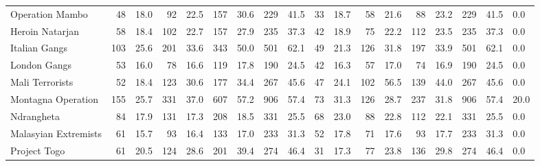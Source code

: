 \begin{tabular}{lrrrrrrrrrrrrrrrrl}
Operation Mambo      &                48 &  18.0 &   92 &  22.5 &  157 &  30.6 &  229 &  41.5 &               33 &   18.7 &   58 &   21.6 &   88 &   23.2 &  229 &  41.5 &        0.0 \\
Heroin Natarjan      &                58 &  18.4 &  102 &  22.7 &  157 &  27.9 &  235 &  37.3 &               42 &   18.9 &   75 &   22.2 &  112 &   23.5 &  235 &  37.3 &        0.0 \\
Italian Gangs        &               103 &  25.6 &  201 &  33.6 &  343 &  50.0 &  501 &  62.1 &               49 &   21.3 &  126 &   31.8 &  197 &   33.9 &  501 &  62.1 &        0.0 \\
London Gangs         &                53 &  16.0 &   78 &  16.6 &  119 &  17.8 &  190 &  24.5 &               42 &   16.3 &   57 &   17.0 &   74 &   16.9 &  190 &  24.5 &        0.0 \\
Mali Terrorists      &                52 &  18.4 &  123 &  30.6 &  177 &  34.4 &  267 &  45.6 &               47 &   24.1 &  102 &   56.5 &  139 &   44.0 &  267 &  45.6 &        0.0 \\
Montagna Operation   &               155 &  25.7 &  331 &  37.0 &  607 &  57.2 &  906 &  57.4 &               73 &   31.3 &  126 &   28.7 &  237 &   31.8 &  906 &  57.4 &       20.0 \\
Ndrangheta           &                84 &  17.9 &  131 &  17.3 &  208 &  18.5 &  331 &  25.5 &               68 &   23.0 &   88 &   22.8 &  112 &   22.1 &  331 &  25.5 &        0.0 \\
Malasyian Extremists &                61 &  15.7 &   93 &  16.4 &  133 &  17.0 &  233 &  31.3 &               52 &   17.8 &   71 &   17.6 &   93 &   17.7 &  233 &  31.3 &        0.0 \\
Project Togo         &                61 &  20.5 &  124 &  28.6 &  201 &  39.4 &  274 &  46.4 &               31 &   17.3 &   77 &   23.8 &  136 &   29.8 &  274 &  46.4 &        0.0 \\
\bottomrule
\end{tabular}
